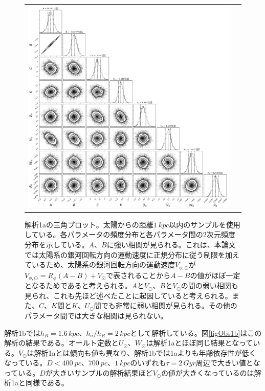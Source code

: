 \begin{figure}
   \centering
\begin{tabular}{cc}
\includegraphics[width=15cm]{fig/1a_triangle.png}
\end{tabular}
    \caption{解析1aの三角プロット。太陽からの距離$\SI{1}{kpc}$以内のサンプルを使用している。各パラメータの頻度分布と各パラメータ間の2次元頻度分布を示している。$A、B$に強い相関が見られる。これは、本論文では太陽系の銀河回転方向の運動速度に正規分布に従う制限を加えているため、太陽系の銀河回転方向の運動速度$V_{\phi,\odot}$が$V_{\phi,\odot}=R_{\phi}(A-B)+V_{\odot}$で表されることから$A-B$の値がほぼ一定となるためであると考えられる。$A$と$V_{\odot}$、$B$と$V_{\odot}$の間の弱い相関も見られ、これも先ほど述べたことに起因していると考えられる。また、$C、 K$間と$K、U_{\odot}$間でも非常に弱い相関が見られる。その他のパラメータ間では大きな相関は見られない。}
    \label{1a_triangle}
\end{figure}

解析1bでは$h_R=1.6\,\si{kpc}、h_{\sigma}/h_R=2\,\si{kpc}$として解析している。図\ref{figObs1b}はこの解析の結果である。オールト定数と$U_{\odot}、W_{\odot}$は解析1aとほぼ同じ結果となっている。$V_{\odot}$は解析1aとは傾向も値も異なり、解析1bでは1aよりも年齢依存性が低くなっている。$D<\SI{400}{pc}、\SI{700}{pc}、\SI{1}{kpc}$のいずれも$\tau=2\,\si{Gyr}$周辺で大きい値となっている。$D$が大きいサンプルの解析結果ほど$V_{\odot}$の値が大きくなっているのは解析1aと同様である。

